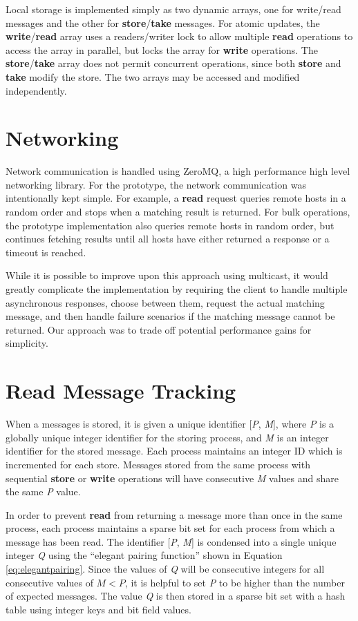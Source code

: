 Local storage is implemented simply as two dynamic arrays, one for write/read messages and the other for \textbf{store}/\textbf{take} messages. For atomic updates, the \textbf{write}/\textbf{read} array uses a readers/writer lock to allow multiple \textbf{read} operations to access the array in parallel, but locks the array for \textbf{write} operations. The \textbf{store}/\textbf{take} array does not permit concurrent operations, since both \textbf{store} and \textbf{take} modify the store. The two arrays may be accessed and modified independently.

\section{Networking}

Network communication is handled using ZeroMQ\cite{hintjens2013zeromq}, a high performance high level networking library. For the prototype, the network communication was intentionally kept simple. For example, a \textbf{read} request queries remote hosts in a random order and stops when a matching result is returned. For bulk operations, the prototype implementation also queries remote hosts in random order, but continues fetching results until all hosts have either returned a response or a timeout is reached.

While it is possible to improve upon this approach using multicast, it would greatly complicate the implementation by requiring the client to handle multiple asynchronous responses, choose between them, request the actual matching message, and then handle failure scenarios if the matching message cannot be returned. Our approach was to trade off potential performance gains for simplicity.

\section{Read Message Tracking}

When a messages is stored, it is given a unique identifier [\textit{P}, \textit{M}], where \textit{P} is a globally unique integer identifier for the storing process, and \textit{M} is an integer identifier for the stored message. Each process maintains an integer ID which is incremented for each store. Messages stored from the same process with sequential \textbf{store} or \textbf{write} operations will have consecutive \textit{M} values and share the same \textit{P} value.

In order to prevent \textbf{read} from returning a message more than once in the same process, each process maintains a sparse bit set for each process from which a message has been read. The identifier [\textit{P}, \textit{M}] is condensed into a single unique integer \textit{Q} using the ``elegant pairing function''\cite{szudzikelegant} shown in Equation \ref{eq:elegantpairing}. Since the values of \textit{Q} will be consecutive integers for all consecutive values of $M < P$, it is helpful to set \textit{P} to be higher than the number of expected messages. The value \textit{Q} is then stored in a sparse bit set with a hash table using integer keys and bit field values.

